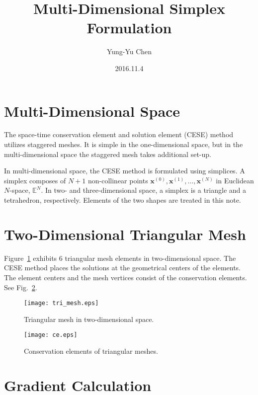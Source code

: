 \documentclass[a4paper,12pt,dvips]{article}
\begin{document}
\title{Multi-Dimensional Simplex Formulation}
\author{Yung-Yu Chen}
\date{2016.11.4}

\maketitle

\tableofcontents

\section{Multi-Dimensional Space}

The space-time conservation element and solution element (CESE) method utilizes
staggered meshes\cite{chang_method_1995}.  It is simple in the one-dimensional
space, but in the multi-dimensional space the staggered mesh takes additional
set-up.

In multi-dimensional space, the CESE method is formulated using
simplices\cite{chang_space-time_1999}.  A simplex composes of $N+1$
non-collinear points $\mathbf{x}^{(0)}, \mathbf{x}^{(1)}, \ldots,
\mathbf{x}^{(N)}$ in Euclidean $N$-space, $\mathbb{E}^N$.  In two- and
three-dimensional space, a simplex is a triangle and a tetrahedron,
respectively.  Elements of the two shapes are treated in this note.

\section{Two-Dimensional Triangular Mesh}

Figure~\ref{f:tri_mesh} exhibits 6 triangular mesh elements in two-dimensional
space.  The CESE method places the solutions at the geometrical centers of the
elements.  The element centers and the mesh vertices consist of the
conservation elements.  See Fig.~\ref{f:ce}.

\begin{figure}[htbp]
\centering
\texttt{[image: tri\_mesh.eps]}
\caption{Triangular mesh in two-dimensional space.}
\label{f:tri_mesh}
\end{figure}

\begin{figure}[htbp]
\centering
\texttt{[image: ce.eps]}
\caption{Conservation elements of triangular meshes.}
\label{f:ce}
\end{figure}

\clearpage

\section{Gradient Calculation}
\end{document}
